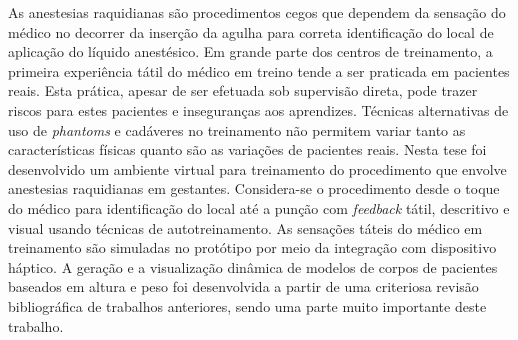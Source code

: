 \begin{resumo}


As anestesias raquidianas são procedimentos cegos que dependem da sensação do médico no decorrer da inserção da agulha para correta identificação do local de aplicação do líquido anestésico. Em grande parte dos centros de treinamento, a primeira experiência tátil do médico em treino tende a ser praticada em pacientes reais. Esta prática, apesar de ser efetuada sob supervisão direta, pode trazer riscos para estes pacientes e inseguranças aos aprendizes. Técnicas alternativas de uso de \textit{phantoms} e cadáveres no treinamento não permitem variar tanto as características físicas quanto são as variações de pacientes reais. 
Nesta tese foi desenvolvido um ambiente virtual para treinamento do procedimento que envolve anestesias raquidianas em gestantes. Considera-se o procedimento desde o toque do médico para identificação do local até a punção com \textit{feedback} tátil, descritivo e visual usando técnicas de autotreinamento. As sensações táteis do médico em treinamento são simuladas no protótipo por meio da integração com dispositivo háptico. A geração e a visualização dinâmica de modelos de corpos de pacientes baseados em altura e peso foi desenvolvida a partir de uma criteriosa revisão bibliográfica de trabalhos anteriores, sendo uma parte muito importante deste trabalho. 

\end{resumo}
